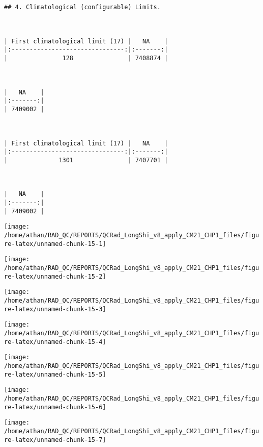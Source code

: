 \documentclass[
  10pt,
  a4paper,oneside]{article}
\begin{document}
\begin{verbatim}
## 4. Climatological (configurable) Limits.



| First climatological limit (17) |   NA    |
|:-------------------------------:|:-------:|
|               128               | 7408874 |



|   NA    |
|:-------:|
| 7409002 |



| First climatological limit (17) |   NA    |
|:-------------------------------:|:-------:|
|              1301               | 7407701 |



|   NA    |
|:-------:|
| 7409002 |
\end{verbatim}

\begin{center}\texttt{[image: /home/athan/RAD\_QC/REPORTS/QCRad\_LongShi\_v8\_apply\_CM21\_CHP1\_files/figure-latex/unnamed-chunk-15-1]} \end{center}

\begin{center}\texttt{[image: /home/athan/RAD\_QC/REPORTS/QCRad\_LongShi\_v8\_apply\_CM21\_CHP1\_files/figure-latex/unnamed-chunk-15-2]} \end{center}

\begin{center}\texttt{[image: /home/athan/RAD\_QC/REPORTS/QCRad\_LongShi\_v8\_apply\_CM21\_CHP1\_files/figure-latex/unnamed-chunk-15-3]} \end{center}

\begin{center}\texttt{[image: /home/athan/RAD\_QC/REPORTS/QCRad\_LongShi\_v8\_apply\_CM21\_CHP1\_files/figure-latex/unnamed-chunk-15-4]} \end{center}

\begin{center}\texttt{[image: /home/athan/RAD\_QC/REPORTS/QCRad\_LongShi\_v8\_apply\_CM21\_CHP1\_files/figure-latex/unnamed-chunk-15-5]} \end{center}

\begin{center}\texttt{[image: /home/athan/RAD\_QC/REPORTS/QCRad\_LongShi\_v8\_apply\_CM21\_CHP1\_files/figure-latex/unnamed-chunk-15-6]} \end{center}

\begin{center}\texttt{[image: /home/athan/RAD\_QC/REPORTS/QCRad\_LongShi\_v8\_apply\_CM21\_CHP1\_files/figure-latex/unnamed-chunk-15-7]} \end{center}
\end{document}
